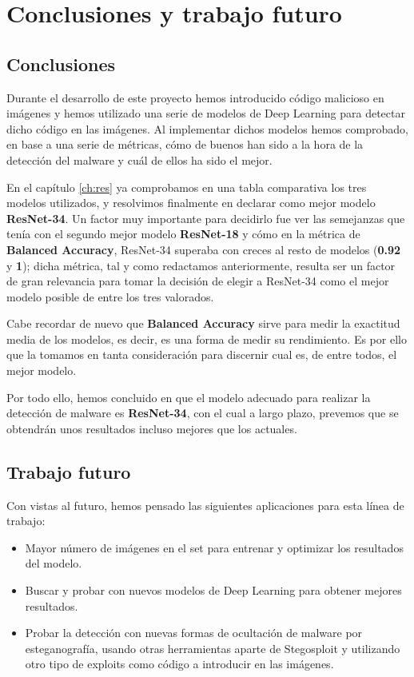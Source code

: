 \chapter{Conclusiones y trabajo futuro}
\label{ch:conc}

\section{Conclusiones}

Durante el desarrollo de este proyecto hemos introducido código malicioso en imágenes y hemos utilizado una serie de modelos de Deep Learning para detectar dicho código en las imágenes. Al implementar dichos modelos hemos comprobado, en base a una serie de métricas, cómo de buenos han sido a la hora de la detección del malware y cuál de ellos ha sido el mejor.

En el capítulo \ref{ch:res} ya comprobamos en una tabla comparativa los tres modelos utilizados, y resolvimos finalmente en declarar como mejor modelo \textbf{ResNet-34}. Un factor muy importante para decidirlo fue ver las semejanzas que tenía con el segundo mejor modelo \textbf{ResNet-18} y cómo en la métrica de \textbf{Balanced Accuracy}, ResNet-34 superaba con creces al resto de modelos (\textbf{0.92} y \textbf{1}); dicha métrica, tal y como redactamos anteriormente, resulta ser un factor de gran relevancia para tomar la decisión de elegir a ResNet-34 como el mejor modelo posible de entre los tres valorados.

Cabe recordar de nuevo que \textbf{Balanced Accuracy} sirve para medir la exactitud media de los modelos, es decir, es una forma de medir su rendimiento. Es por ello que la tomamos en tanta consideración para discernir cual es, de entre todos, el mejor modelo.

Por todo ello, hemos concluido en que el modelo adecuado para realizar la detección de malware es \textbf{ResNet-34}, con el cual a largo plazo, prevemos que se obtendrán unos resultados incluso mejores que los actuales.

\section{Trabajo futuro}

Con vistas al futuro, hemos pensado las siguientes aplicaciones para esta línea de trabajo:

\begin{itemize}
\item Mayor número de imágenes en el set para entrenar y optimizar los resultados del modelo.
\item Buscar y probar con nuevos modelos de Deep Learning para obtener mejores resultados.
\item Probar la detección con nuevas formas de ocultación de malware por esteganografía, usando otras herramientas aparte de Stegosploit y utilizando otro tipo de exploits como código a introducir en las imágenes.
\end{itemize}

